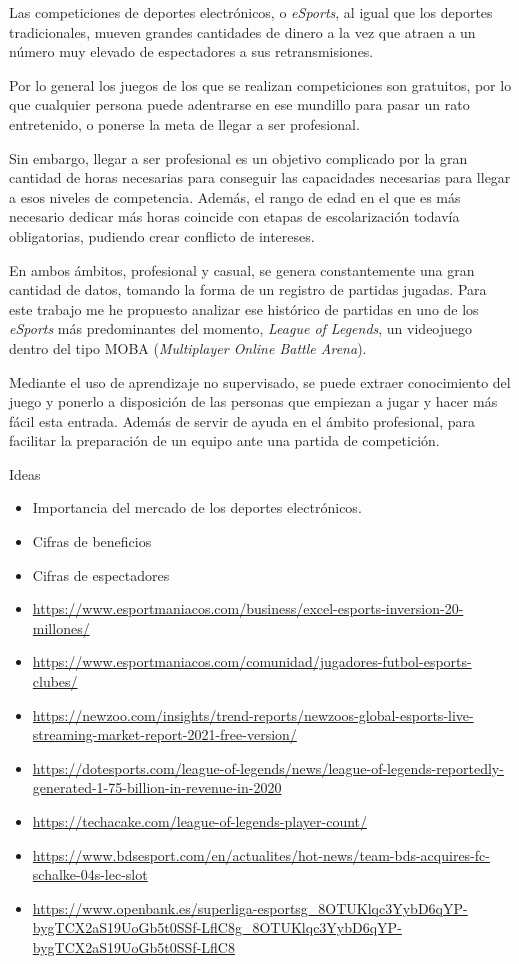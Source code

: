 
Las competiciones de deportes electrónicos, o \textit{eSports}, al igual que los deportes tradicionales, mueven grandes cantidades de dinero a la vez que atraen a un número muy elevado de espectadores a sus retransmisiones.

Por lo general los juegos de los que se realizan competiciones son gratuitos, por lo que cualquier persona puede adentrarse en ese mundillo para pasar un rato entretenido, o ponerse la meta de llegar a ser profesional.

Sin embargo, llegar a ser profesional es un objetivo complicado por la gran cantidad de horas necesarias para conseguir las capacidades necesarias para llegar a esos niveles de competencia. Además, el rango de edad en el que es más necesario dedicar más horas coincide con etapas de escolarización todavía obligatorias, pudiendo crear conflicto de intereses.

En ambos ámbitos, profesional y casual, se genera constantemente una gran cantidad de datos, tomando la forma de un registro de partidas jugadas. Para este trabajo me he propuesto analizar ese histórico de partidas en uno de los \textit{eSports} más predominantes del momento, \textit{League of Legends}, un videojuego dentro del tipo MOBA (\textit{Multiplayer Online Battle Arena}).

Mediante el uso de aprendizaje no supervisado, se puede extraer conocimiento del juego y ponerlo a disposición de las personas que empiezan a jugar y hacer más fácil esta entrada. Además de servir de ayuda en el ámbito profesional, para facilitar la preparación de un equipo ante una partida de competición.

\hfill \break
Ideas
\begin{itemize}
    \item Importancia del mercado de los deportes electrónicos.
    \item Cifras de beneficios
    \item Cifras de espectadores
    \item \url{https://www.esportmaniacos.com/business/excel-esports-inversion-20-millones/}
    \item \url{https://www.esportmaniacos.com/comunidad/jugadores-futbol-esports-clubes/}
    \item \url{https://newzoo.com/insights/trend-reports/newzoos-global-esports-live-streaming-market-report-2021-free-version/}
    \item \url{https://dotesports.com/league-of-legends/news/league-of-legends-reportedly-generated-1-75-billion-in-revenue-in-2020}
    \item \url{https://techacake.com/league-of-legends-player-count/}
    \item \url{https://www.bdsesport.com/en/actualites/hot-news/team-bds-acquires-fc-schalke-04s-lec-slot}
    \item \url{https://www.openbank.es/superliga-esportsg_8OTUKlqc3YybD6qYP-bygTCX2aS19UoGb5t0SSf-LflC8g_8OTUKlqc3YybD6qYP-bygTCX2aS19UoGb5t0SSf-LflC8}
\end{itemize}